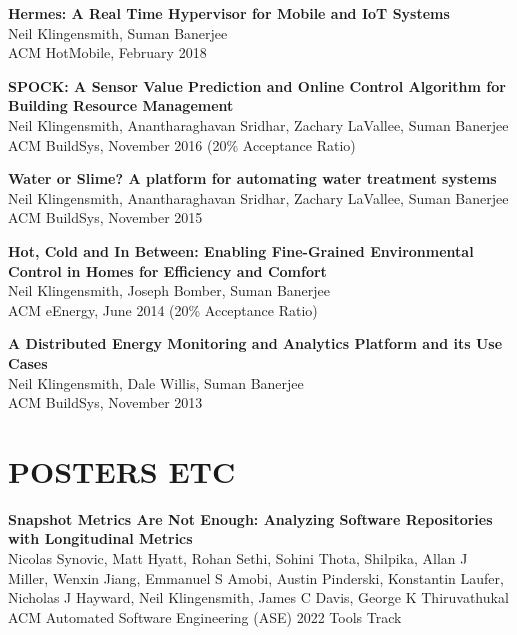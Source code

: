 \documentclass{res}
\begin{document}
\begin{resume}
\begin{etaremune}[leftmargin=0cm,topsep=0pt,itemsep=0pt,partopsep=0pt,parsep=0pt,]
\item
    {\bf Hermes: A Real Time Hypervisor for Mobile and IoT Systems} \\
    Neil Klingensmith, Suman Banerjee \\
    ACM HotMobile, February 2018

\item
    {\bf SPOCK: A Sensor Value Prediction and Online Control Algorithm for Building Resource Management} \\
    Neil Klingensmith, Anantharaghavan Sridhar, Zachary LaVallee, Suman Banerjee \\
    ACM BuildSys, November 2016 (20\% Acceptance Ratio)


\item
    {\bf Water or Slime? A platform for automating water treatment systems} \\
    Neil Klingensmith, Anantharaghavan Sridhar, Zachary LaVallee, Suman Banerjee \\
    ACM BuildSys, November 2015

\item
    {\bf Hot, Cold and In Between: Enabling Fine-Grained Environmental Control in Homes for Efficiency and Comfort} \\
    Neil Klingensmith, Joseph Bomber, Suman Banerjee \\
    ACM eEnergy, June 2014 (20\% Acceptance Ratio)

\item
    {\bf A Distributed Energy Monitoring and Analytics Platform and its Use Cases} \\
    Neil Klingensmith, Dale Willis, Suman Banerjee \\
    ACM BuildSys, November 2013

\end{etaremune}


\def\labelprefix{P}
\section{POSTERS ETC}

\begin{etaremune}[leftmargin=0cm] 

\item
    {\bf Snapshot Metrics Are Not Enough: Analyzing Software Repositories with Longitudinal Metrics} \\
    Nicolas Synovic, Matt Hyatt, Rohan Sethi, Sohini Thota, Shilpika, Allan J Miller, Wenxin Jiang, Emmanuel S Amobi, Austin Pinderski, Konstantin Laufer, Nicholas J Hayward, Neil Klingensmith, James C Davis, George K Thiruvathukal \\
    ACM Automated Software Engineering (ASE) 2022 Tools Track


\end{etaremune}
\end{resume}
\end{document}
